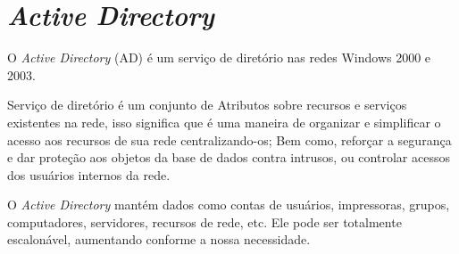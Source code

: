 % 
% 




\section{\textit{Active Directory}}

O \textit{Active Directory} (AD) é um serviço de diretório nas redes Windows 2000 e 2003.

Serviço de diretório é um conjunto de Atributos sobre recursos e serviços existentes na rede, isso significa que é uma maneira de organizar e simplificar o acesso aos recursos de sua rede centralizando-os; Bem como, reforçar a segurança e dar proteção aos objetos da base de dados contra intrusos, ou controlar acessos dos usuários internos da rede.

O \textit{Active Directory} mantém dados como contas de usuários, impressoras, grupos, computadores, servidores, recursos de rede, etc. Ele pode ser totalmente escalonável, aumentando conforme a nossa necessidade.\cite{LOSANO}

